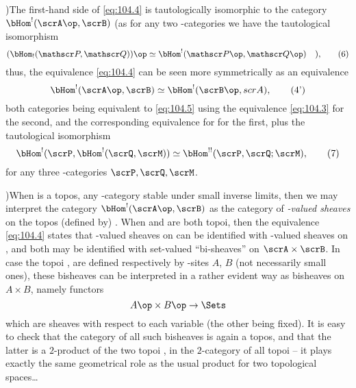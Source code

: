 \begin{remarks}
  )\enspace The first-hand side of
  \eqref{eq:104.4} is tautologically isomorphic to the category
  $\bHom^!(\scrA\op,\scrB)$ (as for any two \scrU-categories we have
  the tautological isomorphism
  \begin{equation}
    \label{eq:104.6}
    (\bHom_!(\mathscr P,\mathscr Q))\op \simeq \bHom^!(\mathscr P\op,
    \mathscr Q\op)\quad\text{),}\tag{6}
  \end{equation}
  thus, the equivalence \eqref{eq:104.4} can be seen more
  symmetrically as an equivalence
  \begin{equation}
    \label{eq:104.4prime}
    \bHom^!(\scrA\op,\scrB)\simeq\bHom^!(\scrB\op,scrA),\tag{4'}
  \end{equation}
  both categories being equivalent to \eqref{eq:104.5} using the
  equivalence \eqref{eq:104.3} for the second, and the corresponding
  equivalence for \scrB{} for the first, plus the tautological
  isomorphism
  \begin{equation}
    \label{eq:104.7}
    \bHom^!(\scrP, \bHom^!(\scrQ,\scrM)) \simeq
    \bHom^{!!}(\scrP, \scrQ; \scrM),\tag{7}
  \end{equation}
  for any three \scrU-categories $\scrP,\scrQ,\scrM$.

  )\enspace When \scrA{} is a topos, \scrB{}
  any \scrU-category stable under small inverse limits, then we may
  interpret the category $\bHom^!(\scrA\op,\scrB)$ as the category of
  \emph{\scrB-valued sheaves} on the topos (defined by) \scrA. When
  \scrA{} and \scrB{} are both topoi, then the equivalence
  \eqref{eq:104.4} states that \scrB-valued sheaves on \scrA{} can be
  identified with \scrA-valued sheaves on \scrB, and both may be
  identified with set-valued ``bi-sheaves'' on $\scrA\times\scrB$. In
  case the topoi \scrA, \scrB{} are defined respectively by
  \scrU-sites $A$, $B$ (not necessarily small ones), these
  bisheaves can be interpreted in a rather evident way as bisheaves on
  $A\times B$, namely functors
  \[A\op\times B\op\to\Sets\]
  which are sheaves with respect to each variable (the other being
  fixed). It is easy to check that the category of all such bisheaves
  is again a topos, and that the latter is a $2$-product of the two
  topoi \scrA, \scrB{} in the $2$-category of all topoi -- it plays
  exactly the same geometrical role as the usual product for two
  topological spaces\ldots
\end{remarks}

